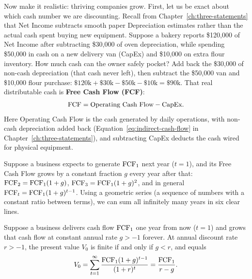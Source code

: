 Now make it realistic: thriving companies grow. First, let us be exact about which cash number we are discounting. Recall from Chapter~\ref{ch:three-statements} that Net Income subtracts smooth paper Depreciation estimates rather than the actual cash spent buying new equipment. Suppose a bakery reports \$120,000 of Net Income after subtracting \$30,000 of oven depreciation, while spending \$50,000 in cash on a new delivery van (CapEx) and \$10,000 on extra flour inventory. How much cash can the owner safely pocket? Add back the \$30,000 of non-cash depreciation (that cash never left), then subtract the \$50,000 van and \$10,000 flour purchase: $\$120\text{k} + \$30\text{k} - \$50\text{k} - \$10\text{k} = \$90\text{k}$. That real distributable cash is \textbf{Free Cash Flow (FCF)}:
\[
 \operatorname{FCF} = \text{Operating Cash Flow} - \text{CapEx}.
\]
Here Operating Cash Flow is the cash generated by daily operations, with non-cash depreciation added back (Equation~\eqref{eq:indirect-cash-flow} in Chapter~\ref{ch:three-statements}), and subtracting CapEx deducts the cash wired for physical equipment.

Suppose a business expects to generate $\operatorname{FCF}_1$ next year ($t = 1$), and its Free Cash Flow grows by a constant fraction $g$ every year after that: $\operatorname{FCF}_2 = \operatorname{FCF}_1(1+g)$, $\operatorname{FCF}_3 = \operatorname{FCF}_1(1+g)^2$, and in general $\operatorname{FCF}_t = \operatorname{FCF}_1(1+g)^{t-1}$. Using a geometric series (a sequence of numbers with a constant ratio between terms), we can sum all infinitely many years in six clear lines.

\begin{proposition}\label{prop:ch03-gordon}
Suppose a business delivers cash flow $\operatorname{FCF}_1$ one year from now ($t = 1$) and grows that cash flow at constant annual rate $g > -1$ forever. At annual discount rate $r > -1$, the present value $V_0$ is finite if and only if $g < r$, and equals
\begin{equation}
 V_0 = \sum_{t=1}^{\infty} \frac{\operatorname{FCF}_1(1+g)^{t-1}}{(1+r)^t} = \frac{\operatorname{FCF}_1}{r - g}.
 \label{eq:gordon-growth}
\end{equation}
\end{proposition}

